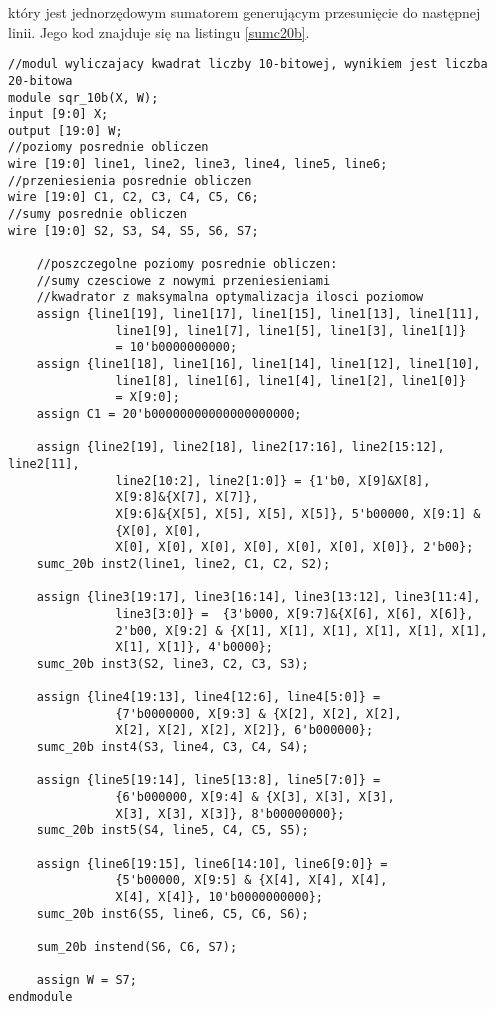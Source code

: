 \documentclass[a4paper]{article}
\begin{document}
który jest jednorzędowym sumatorem generującym przesunięcie do następnej linii. Jego kod znajduje się na listingu \ref{sumc20b}.
\begin{lstlisting}[label=kwadr] 
//modul wyliczajacy kwadrat liczby 10-bitowej, wynikiem jest liczba 20-bitowa
module sqr_10b(X, W);
input [9:0] X;
output [19:0] W;
//poziomy posrednie obliczen
wire [19:0] line1, line2, line3, line4, line5, line6;
//przeniesienia posrednie obliczen
wire [19:0] C1, C2, C3, C4, C5, C6;
//sumy posrednie obliczen
wire [19:0] S2, S3, S4, S5, S6, S7;

	//poszczegolne poziomy posrednie obliczen:
	//sumy czesciowe z nowymi przeniesieniami
	//kwadrator z maksymalna optymalizacja ilosci poziomow
	assign {line1[19], line1[17], line1[15], line1[13], line1[11], 
			   line1[9], line1[7], line1[5], line1[3], line1[1]} 
			   = 10'b0000000000;
	assign {line1[18], line1[16], line1[14], line1[12], line1[10], 
			   line1[8], line1[6], line1[4], line1[2], line1[0]}
			   = X[9:0];
	assign C1 = 20'b00000000000000000000;
	
	assign {line2[19], line2[18], line2[17:16], line2[15:12], line2[11], 
			   line2[10:2], line2[1:0]} = {1'b0, X[9]&X[8], 
			   X[9:8]&{X[7], X[7]}, 
			   X[9:6]&{X[5], X[5], X[5], X[5]}, 5'b00000, X[9:1] & 
			   {X[0], X[0], 
			   X[0], X[0], X[0], X[0], X[0], X[0], X[0]}, 2'b00};
	sumc_20b inst2(line1, line2, C1, C2, S2);
	
	assign {line3[19:17], line3[16:14], line3[13:12], line3[11:4], 
			   line3[3:0]} =  {3'b000, X[9:7]&{X[6], X[6], X[6]}, 
			   2'b00, X[9:2] & {X[1], X[1], X[1], X[1], X[1], X[1],
			   X[1], X[1]}, 4'b0000};
	sumc_20b inst3(S2, line3, C2, C3, S3);
	
	assign {line4[19:13], line4[12:6], line4[5:0]} = 
			   {7'b0000000, X[9:3] & {X[2], X[2], X[2],
			   X[2], X[2], X[2], X[2]}, 6'b000000};
	sumc_20b inst4(S3, line4, C3, C4, S4);
	
	assign {line5[19:14], line5[13:8], line5[7:0]} = 
			   {6'b000000, X[9:4] & {X[3], X[3], X[3], 
			   X[3], X[3], X[3]}, 8'b00000000};
	sumc_20b inst5(S4, line5, C4, C5, S5);
	
	assign {line6[19:15], line6[14:10], line6[9:0]} = 
			   {5'b00000, X[9:5] & {X[4], X[4], X[4],
			   X[4], X[4]}, 10'b0000000000};
	sumc_20b inst6(S5, line6, C5, C6, S6);

	sum_20b instend(S6, C6, S7);

	assign W = S7;
endmodule
\end{lstlisting}
\end{document}

